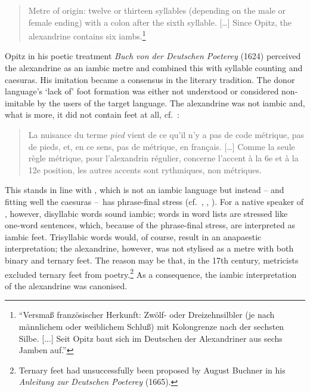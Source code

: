 \documentclass[output=paper
  ,nobabel
  ,uniformtopskip %
]{langscibook}
\begin{document}
\begin{quote}
Metre of  origin: twelve or thirteen syllables (depending on the male or female ending) with a colon after the sixth syllable. […] Since Opitz, the  alexandrine contains six iambs.\footnote{``Versmaß französischer Herkunft: Zwölf- oder Dreizehnsilbler (je nach männlichem oder weiblichem Schluß) mit Kolongrenze nach der sechsten Silbe. [...] Seit Opitz baut sich im Deutschen der Alexandriner aus sechs Jamben auf.''}
\end{quote}

\noindent
Opitz in his poetic treatment \textit{Buch von der Deutschen Poeterey} (1624) perceived the  alexandrine as an iambic metre and combined this with syllable counting and caesuras. His imitation became a consensus in the  literary tradition. The donor language's `lack of' foot formation was either not understood or considered non-imitable by the users of the target language. The  alexandrine was not iambic and, what is more, it did not contain feet at all, cf.\ \citet[229]{Meschonnic1982}:


\begin{quote}
La nuisance du terme \textit{pied} vient de ce qu'il n'y a pas de code métrique, pas de pieds, et, en ce sens, pas de métrique, en français. […] Comme la seule règle métrique, pour l'alexandrin régulier, concerne l'accent à la 6e et à la 12e position, les autres accents sont rythmiques, non métriques. 
\end{quote}

\noindent
This stands in line with , which is not an iambic language but instead – and fitting well the caesuras –~has phrase-final stress (cf.\ \citealt[229]{Meschonnic1982}, \citealt{Kurylowicz1945}, \citealt{JunFougeron2002}). For a native speaker of , however,  disyllabic words sound iambic; words in word lists are stressed like one-word sentences, which, because of the phrase-final stress, are interpreted as iambic feet. Trisyllabic  words would, of course, result in an anapaestic interpretation; the alexandrine, however, was not stylised as a metre with both binary and ternary feet. The reason may be that, in the 17th century,  metricists excluded ternary feet from  poetry.\footnote{Ternary feet had unsuccessfully been proposed by August Buchner in his \textit{Anleitung zur Deutschen Poeterey} (1665).} As a consequence, the iambic interpretation of the alexandrine was canonised. 
\end{document}
